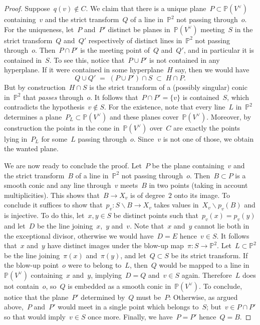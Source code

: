 \documentclass[a4paper]{amsart}
\newcommand{\bbP}{\mathbb{P}}
\theoremstyle{plain}
\theoremstyle{definition}
\numberwithin{equation}{section}
\begin{document}
\begin{proof}
Suppose~$q(v) \not \in C$. We claim that there is a unique plane~$P \subset \bbP(V^\vee)$ containing~$v$ and the strict transform~$Q$ of a line in~$\bbP^2$ not passing through~$o$. For the uniqueness, let~$P$ and~$P'$ distinct be planes in~$\bbP(V^\vee)$ meeting~$S$ in the strict transform~$Q$ and~$Q'$ respectively of distinct lines in~$\bbP^2$ not passing through~$o$. Then~$P \cap P'$ is the meeting point of~$Q$ and~$Q'$, and in particular it is contained in~$S$. To see this, notice that~$P \cup P'$ is not contained in any hyperplane. If it were contained in some hyperplane~$H$ say, then we would have
\[ Q \cup Q' \; = \; (P \cup P') \cap S \; \subset \; H \cap P.\]
But by construction~$H \cap S$ is the strict transform of a (possibly singular) conic in~$\bbP^2$ that \emph{passes} through~$o$. It follows that~$P \cap P' = \{ v \}$ is contained~$S$, which contradicts the hypothesis~$v \not \in S$. For the existence, note that every line~$L$ in~$\bbP^2$ determines a plane~$P_L \subset \bbP(V^\vee)$ and these planes cover~$\bbP(V^\vee)$. Moreover, by construction the points in the cone in~$\bbP(V^\vee)$ over~$C$ are exactly the points lying in~$P_L$ for some~$L$ passing through~$o$. Since~$v$ is not one of those, we obtain the wanted plane. \medskip

We are now ready to conclude the proof. Let~$P$ be the plane containing~$v$ and the strict transform~$B$ of a line in~$\bbP^2$ not passing through~$o$. Then~$B \subset P$ is a smooth conic and any line through~$v$ meets~$B$ in two points (taking in account multiplicities). This shows that~$B \to X_v$ is of degree~$2$ onto its image. To conclude it suffices to show that~$p_v \colon S \smallsetminus B \to X_v$ takes values in~$X_v \smallsetminus p_v(B)$ and is injective. To do this, let~$x, y \in S$ be distinct points such that~$p_v(x) = p_v(y)$ and let~$D$ be the line joining~$x$,~$y$ and~$v$. Note that~$x$ and~$y$ cannot lie both in the exceptional divisor, otherwise we would have~$D = E$ hence~$v \in S$. It follows that~$x$ and~$y$ have distinct images under the blow-up map~$\pi \colon S \to \bbP^2$. Let~$L \subset \bbP^2$ be the line joining~$\pi(x)$ and~$\pi(y)$, and let~$Q \subset S$ be its strict transform. If the blow-up point~$o$ were to belong to~$L$, then~$Q$ would be mapped to a line in~$\bbP(V^\vee)$ containing~$x$ and~$y$, implying~$D = Q$ and~$v \in S$ again. Therefore~$L$ does not contain~$o$, so~$Q$ is embedded as a smooth conic in~$\bbP(V^\vee)$. To conclude, notice that the plane~$P'$ determined by~$Q$ must be~$P$: Otherwise, as argued above,~$P$ and~$P'$ would meet in a single point which belongs to~$S$; but~$v \in P \cap P'$ so that would imply~$v \in S$ once more. Finally, we have~$ P = P'$ hence~$Q = B$.
\end{proof}
\end{document}
